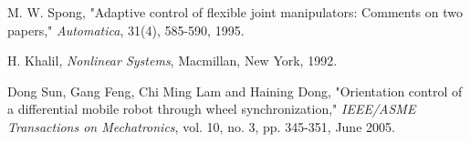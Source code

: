 \documentclass[letterpaper, 10 pt, conference]{ieeeconf}
\begin{document}


\begin{thebibliography}{200}
M. W. Spong, "Adaptive control of flexible joint manipulators:
Comments on two papers," {\em Automatica}, 31(4), 585-590, 1995.

H. Khalil, \emph{Nonlinear Systems}, Macmillan, New York, 1992.

Dong Sun, Gang Feng, Chi Ming Lam and Haining Dong, "Orientation control of a differential mobile robot through wheel synchronization," {\em IEEE/ASME Transactions on Mechatronics}, vol. 10, no. 3, pp. 345-351, June 2005.

%
%
%
%
%
%
%
%
%

\end{thebibliography}
\end{document}
